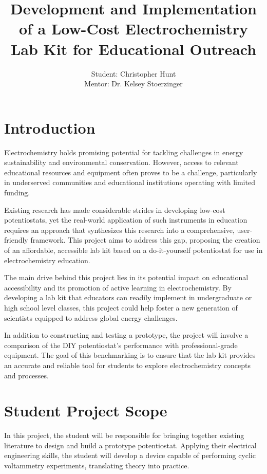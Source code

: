 \documentclass{article}
\title{\textcolor{mycolor}{\textbf{{\huge Development and Implementation of a Low-Cost Electrochemistry Lab Kit for Educational Outreach}}}}
\author{Student: Christopher Hunt \\ Mentor: Dr. Kelsey Stoerzinger}
\date{}
\begin{document}
\pagestyle{fancy}
\fancyhf{}
\rfoot{}
\rhead{\thepage}
\maketitle
\section*{\textcolor{mycolor}{Introduction}}
Electrochemistry holds promising potential for tackling challenges in energy sustainability and environmental conservation. However, access to relevant educational resources and equipment often proves to be a challenge, particularly in underserved communities and educational institutions operating with limited funding.

Existing research has made considerable strides in developing low-cost potentiostats, yet the real-world application of such instruments in education requires an approach that synthesizes this research into a comprehensive, user-friendly framework. This project aims to address this gap, proposing the creation of an affordable, accessible lab kit based on a do-it-yourself potentiostat for use in electrochemistry education.

The main drive behind this project lies in its potential impact on educational accessibility and its promotion of active learning in electrochemistry. By developing a lab kit that educators can readily implement in undergraduate or high school level classes, this project could help foster a new generation of scientists equipped to address global energy challenges.

In addition to constructing and testing a prototype, the project will involve a comparison of the DIY potentiostat's performance with professional-grade equipment. The goal of this benchmarking is to ensure that the lab kit provides an accurate and reliable tool for students to explore electrochemistry concepts and processes.

\section*{\textcolor{mycolor}{Student Project Scope}}
In this project, the student will be responsible for bringing together existing literature to design and build a prototype potentiostat. Applying their electrical engineering skills, the student will develop a device capable of performing cyclic voltammetry experiments, translating theory into practice.
\end{document}
